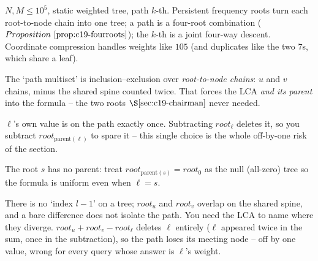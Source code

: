 \(N,M\le10^5\), static weighted tree, path \(k\)-th. Persistent frequency roots turn each root-to-node chain into one tree; a path is a four-root combination (\(\propref{c19-fourroots}\)); the \(k\)-th is a joint four-way descent. Coordinate compression handles weights like \(105\) (and duplicates like the two \(7\)s, which share a leaf).

\begin{observation}
The `path multiset' is inclusion--exclusion over \emph{root-to-node chains}: \(u\) and \(v\) chains, minus the shared spine counted twice. That forces the LCA \emph{and its parent} into the formula -- the two roots \(\secref{c19-chairman}\) never needed.
\end{observation}
\begin{observation}
\(\ell\)'s own value is on the path exactly once. Subtracting \(\mathit{root}_\ell\) deletes it, so you subtract \(\mathit{root}_{\mathrm{parent}(\ell)}\) to spare it -- this single choice is the whole off-by-one risk of the section.
\end{observation}
\begin{observation}
The root \(s\) has no parent: treat \(\mathit{root}_{\mathrm{parent}(s)}=\mathit{root}_0\) as the null (all-zero) tree so the formula is uniform even when \(\ell=s\).
\end{observation}

\begin{thinkbox}
{There is no `index \(l-1\)' on a tree; \(\mathit{root}_u\) and \(\mathit{root}_v\) overlap on the shared spine, and a bare difference does not isolate the path. You need the LCA to name where they diverge.}
{\(\mathit{root}_u+\mathit{root}_v-\mathit{root}_\ell\) deletes \(\ell\) entirely (\(\ell\) appeared twice in the sum, once in the subtraction), so the path loses its meeting node -- off by one value, wrong for every query whose answer is \(\ell\)'s weight.}
\end{thinkbox}

